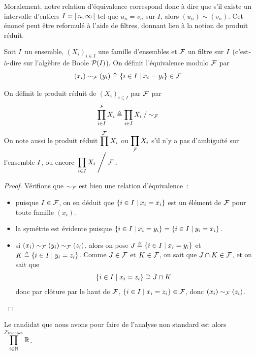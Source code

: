 Moralement, notre relation d'équivalence correspond donc à dire que s'il existe
un intervalle d'entiers $I = \mathord{\left]\,n,\infty\,\right[}$ tel que $u_n = v_n$ sur $I$,
alors $(u_n) \sim (v_n)$. Cet énoncé peut être reformulé à l'aide de filtres,
donnant lieu à la notion de produit réduit.

\begin{definition}
  Soit $I$ un ensemble, $(X_i)_{i\in I}$ une famille d'ensembles et
  $\mathcal{F}$ un filtre sur $I$ (c'est-à-dire sur l'algèbre de Boole
  $\mathcal{P}(I)$). On définit l'équivalence modulo $\mathcal{F}$ par
  \[(x_i) \sim_{\mathcal{F}} (y_i) \triangleq
  \left\{ i \in I \;\middle\vert\; x_i = y_i \right\} \in \mathcal{F}\]

  On définit le produit réduit de $(X_i)_{i \in I}$ par $\mathcal{F}$ par
  \[\prod_{i \in I}^{\mathcal{F}} X_i \triangleq
  \mathord{\prod_{i \in I} X_i}\mathbin{/}\mathord{\sim_{\mathcal{F}}}\]
  On note aussi le produit réduit
  $\displaystyle\prod^{\mathcal{F}} X_i$ ou $\displaystyle\prod_{\mathcal{F}} X_i$
  s'il n'y a pas d'ambiguïté sur l'ensemble $I$, ou encore
  $\displaystyle\left.\prod_{i \in I} X_i\;\middle/\; \mathcal{F}\right.$.
\end{definition}

\begin{proof}
  Vérifions que $\sim_{\mathcal{F}}$ est bien une relation d'équivalence~:
  \begin{itemize}
  \item puisque $I \in \mathcal{F}$, on en déduit que
    $\left\{ i \in I \;\middle\vert\; x_i=x_i \right\}$ est un élément de $\mathcal{F}$ pour toute
    famille $(x_i)$.
  \item la symétrie est évidente puisque
    $\left\{ i\in I \;\middle\vert\; x_i=y_i \right\} = \left\{ i\in I \;\middle\vert\; y_i=x_i \right\}$.
  \item si $(x_i)\sim_{\mathcal{F}} (y_i)\sim_{\mathcal{F}} (z_i)$, alors on pose
    $J \triangleq \left\{ i \in I \;\middle\vert\; x_i = y_i \right\}$ et
    $K \triangleq \left\{ i \in I \;\middle\vert\; y_i = z_i \right\}$. Comme
    $J \in \mathcal{F}$ et $K\in\mathcal{F}$, on sait que
    $J \cap K \in \mathcal{F}$, et on sait que
    \[\left\{ i \in I \;\middle\vert\; x_i = z_i \right\}\supseteq J \cap K\]
    donc par clôture par le haut de $\mathcal{F}$,
    $\left\{ i \in I \;\middle\vert\; x_i = z_i \right\} \in \mathcal{F}$, donc
    $(x_i)\sim_{\mathcal{F}} (z_i)$. \qedhere
  \end{itemize}
\end{proof}

Le candidat que nous avons pour faire de l'analyse non standard est alors
$\displaystyle\prod_{i \in \mathbb N}^{\mathcal{F}_{\mathrm{Frechet}}} \mathbb R$.

